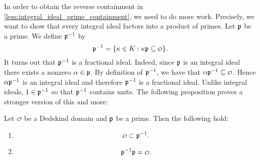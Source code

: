     In order to obtain the reverse containment in \cref{lem:integral_ideal_prime_containment}, we need to do more work. Precisely, we want to show that every integral ideal factors into a product of primes. Let $\mathfrak{p}$ be a prime. We define $\mathfrak{p}^{-1}$ by
    \[
      \mf{p}^{-1} = \{\k \in K:\k\mf{p} \subseteq \smc{O}\}.
    \]
    It turns out that $\mathfrak{p}^{-1}$ is a fractional ideal. Indeed, since $\mathfrak{p}$ is an integral ideal there exists a nonzero $\alpha \in \mathfrak{p}$. By definition of $\mathfrak{p}^{-1}$, we have that $\a\mf{p}^{-1} \subseteq \smc{O}$. Hence $\alpha\mathfrak{p}^{-1}$ is an integral ideal and therefore $\mathfrak{p}^{-1}$ is a fractional ideal. Unlike integral ideals, $1 \in \mathfrak{p}^{-1}$ so that $\mathfrak{p}^{-1}$ contains units. The following proposition proves a stronger version of this and more:

    \begin{lemma}\label{lem:inverse_for_prime_ideals}
      Let $\smc{O}$ be a Dedekind domain and $\mathfrak{p}$ be a prime. Then the following hold:
      \begin{enumerate}[label=(\roman*)]
        \item
        \[
          \smc{O} \subset \mf{p}^{-1}.
        \]
        \item
        \[
          \mf{p}^{-1}\mf{p} = \smc{O}.
        \]
      \end{enumerate}
    \end{lemma}
